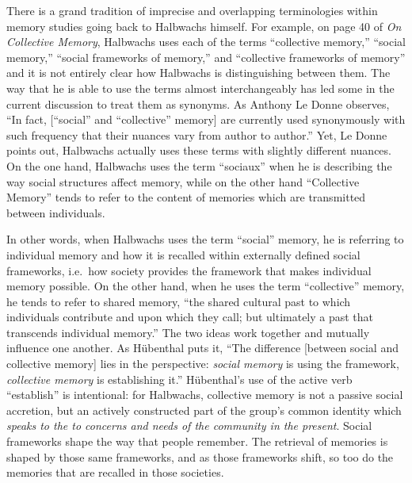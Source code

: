 There is a grand tradition of imprecise and overlapping terminologies
within memory studies going back to Halbwachs himself. For example, on
page 40 of \emph{On Collective Memory}, Halbwachs uses each of the terms
``collective memory,'' ``social memory,'' ``social frameworks of
memory,'' and ``collective frameworks of memory'' and it is not entirely
clear how Halbwachs is distinguishing between them. The way that he is
able to use the terms almost interchangeably has led some in the current
discussion to treat them as synonyms. As Anthony Le Donne observes, ``In
fact, {[}``social'' and ``collective'' memory{]} are currently used
synonymously with such frequency that their nuances vary from author to
author.''\autocite[42 n.8]{ledonne2009} Yet, Le Donne points out,
Halbwachs actually uses these terms with slightly different nuances. On
the one hand, Halbwachs uses the term ``sociaux'' when he is describing
the way social structures affect memory, while on the other hand
``Collective Memory'' tends to refer to the content of memories which
are transmitted between individuals.

In other words, when Halbwachs uses the term ``social'' memory, he is
referring to individual memory and how it is recalled within externally
defined social frameworks, i.e.~how society provides the framework that
makes individual memory
possible.\autocite[180]{hubenthal_carstens-hasselbalch2012} On the other
hand, when he uses the term ``collective'' memory, he tends to refer to
shared memory, ``the shared cultural past to which individuals
contribute and upon which they call; but ultimately a past that
transcends individual memory.''\autocites[360]{keith_ec2015}[See
also][180]{hubenthal_carstens-hasselbalch2012} The two ideas work
together and mutually influence one another. As Hübenthal puts it, ``The
difference {[}between social and collective memory{]} lies in the
perspective: \emph{social memory} is using the framework,
\emph{collective memory} is establishing
it.''\autocite[180.]{hubenthal_carstens-hasselbalch2012} Hübenthal's use
of the active verb ``establish'' is intentional: for Halbwachs,
collective memory is not a passive social accretion, but an actively
constructed part of the group's common identity which \emph{speaks to
the to concerns and needs of the community in the present}. Social
frameworks shape the way that people remember. The retrieval of memories
is shaped by those same frameworks, and as those frameworks shift, so
too do the memories that are recalled in those societies.\autocites[For
a modern assessments on the malleability of human memory and the effects
of social networks on the formation of collective memory,
see][]{coman-etal_pnas2016}{yamashiro-hirst_jarmc2014}{coman-etal_yang-etal2012}

